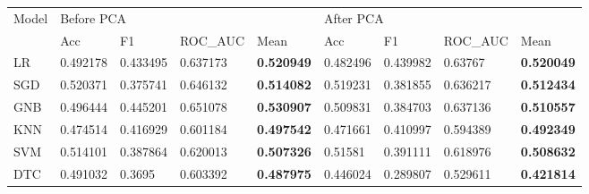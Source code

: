 \documentclass[a4paper,12pt]{article}
\begin{document}
	\begin{table}[H]
		\centering
		\begin{tabular}{@{}lllllllll@{}}
			\toprule
			\multicolumn{1}{l|}{\multirow{2}{*}{Model}} & \multicolumn{4}{l|}{Before PCA}                                                                               & \multicolumn{4}{l|}{After PCA}                                                                                \\ \cmidrule(l){2-9} 
			\multicolumn{1}{l|}{}                       & \multicolumn{1}{l|}{Acc} & \multicolumn{1}{l|}{F1} & \multicolumn{1}{l|}{ROC\_AUC} & \multicolumn{1}{l|}{Mean} & \multicolumn{1}{l|}{Acc} & \multicolumn{1}{l|}{F1} & \multicolumn{1}{l|}{ROC\_AUC} & \multicolumn{1}{l|}{Mean} \\ \midrule
			LR                                          & 0.492178                 & 0.433495                & 0.637173                     & \textbf{0.520949}                  & 0.482496                 & 0.439982                & 0.63767                      & \textbf{0.520049}                  \\
			SGD                                         & 0.520371                 & 0.375741                & 0.646132                     & \textbf{0.514082}                  & 0.519231                 & 0.381855                & 0.636217                     & \textbf{0.512434}                  \\
			GNB                                         & 0.496444                 & 0.445201                & 0.651078                     & \textbf{0.530907}                  & 0.509831                 & 0.384703                & 0.637136                     & \textbf{0.510557}                  \\
			KNN                                         & 0.474514                 & 0.416929                & 0.601184                     & \textbf{0.497542}                  & 0.471661                 & 0.410997                & 0.594389                     & \textbf{0.492349}                  \\
			SVM                                         & 0.514101                 & 0.387864                & 0.620013                     & \textbf{0.507326}                  & 0.51581                  & 0.391111                & 0.618976                     & \textbf{0.508632}                  \\
			DTC                                         & 0.491032                 & 0.3695                  & 0.603392                     & \textbf{0.487975}                  & 0.446024                 & 0.289807                & 0.529611                     & \textbf{0.421814}                  \\

\end{tabular}
\end{table}
\end{document}
